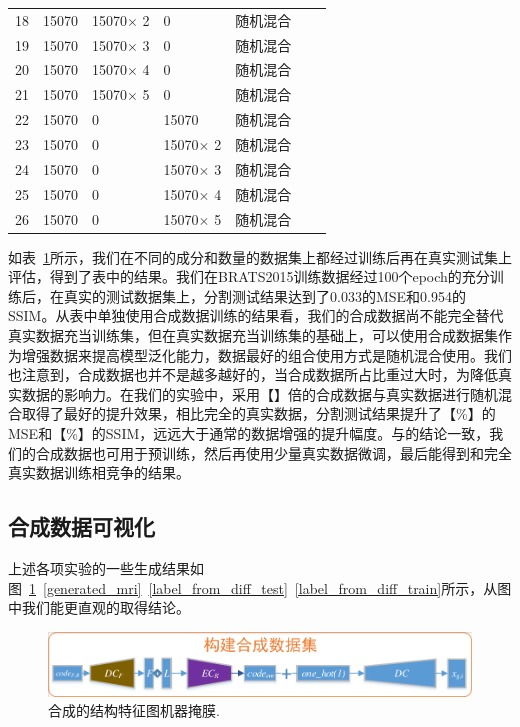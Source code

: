 \documentclass[letterpaper]{article} %
\begin{document}
\begin{table}[t]
{\begin{tabular}{l|l|l|l|l|l|l}
			18& 15070 & 15070$\times$ 2  &0 &随机混合 & & \\
			19& 15070 & 15070$\times$ 3  &0 &随机混合 & & \\
			20& 15070 & 15070$\times$ 4  &0 &随机混合 & & \\
			21& 15070 & 15070$\times$ 5  &0 &随机混合 & & \\
			
			22& 15070 &0 & 15070 &随机混合 & & \\
			23& 15070 &0 & 15070$\times$ 2 &随机混合 & & \\
			24& 15070 &0 & 15070$\times$ 3 &随机混合 & & \\
			25& 15070 &0 & 15070$\times$ 4 &随机混合 & & \\
			26& 15070 &0 & 15070$\times$ 5 &随机混合 & & \\
		\end{tabular}
	}
	\label{use_test}
\end{table}
如表~\ref{use_test}所示，我们在不同的成分和数量的数据集上都经过训练后再在真实测试集上评估，得到了表中的结果。我们在BRATS2015训练数据经过100个epoch的充分训练后，在真实的测试数据集上，分割测试结果达到了0.033的MSE和0.954的SSIM。从表中单独使用合成数据训练的结果看，我们的合成数据尚不能完全替代真实数据充当训练集，但在真实数据充当训练集的基础上，可以使用合成数据集作为增强数据来提高模型泛化能力，数据最好的组合使用方式是随机混合使用。我们也注意到，合成数据也并不是越多越好的，当合成数据所占比重过大时，为降低真实数据的影响力。在我们的实验中，采用【】倍的合成数据与真实数据进行随机混合取得了最好的提升效果，相比完全的真实数据，分割测试结果提升了【\%】的MSE和【\%】的SSIM，远远大于通常的数据增强的提升幅度。与\cite{4shin2018medical}的结论一致，我们的合成数据也可用于预训练，然后再使用少量真实数据微调，最后能得到和完全真实数据训练相竞争的结果。

\subsection{合成数据可视化}
上述各项实验的一些生成结果如图~\ref{generated_f}~\ref{generated_mri}~\ref{label_from_diff_test}~\ref{label_from_diff_train}所示，从图中我们能更直观的取得结论。
\begin{figure}
	\centering
	\includegraphics[width=0.98\linewidth]{figures/make_data}
	\caption{合成的结构特征图机器掩膜.}
	\label{generated_f}
\end{figure}
\end{document}
